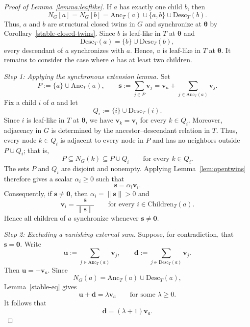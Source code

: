 \documentclass[10pt,a4paper]{amsart}
\begin{document}
\begin{proof}[Proof of Lemma~\ref{lemma:leaflike}]
If $a$ has exactly one child $b$, then
\[
    N_G[a]=N_G[b]
    =\mathrm{Anc}_T(a)\cup\{a,b\}\cup\mathrm{Desc}_T(b).
\]
Thus, $a$ and $b$ are structural closed twins in $G$ and
synchronize at $\boldsymbol{\theta}$ by
Corollary~\ref{stable-closed-twins}.
Since $b$ is leaf-like in $T$ at $\boldsymbol{\theta}$ and
\[
    \mathrm{Desc}_T(a)=\{b\}\cup\mathrm{Desc}_T(b),
\]
every descendant of $a$ synchronizes with $a$.
Hence, $a$ is leaf-like in $T$ at $\boldsymbol{\theta}$.
It remains to consider the case where $a$ has at least two
children.

\medskip
\noindent
\textit{Step 1: Applying the synchronous extension lemma.}
Set
\[
    P:=\{a\}\cup\mathrm{Anc}_T(a),
    \qquad
    \mathbf{s}:=\sum_{j\in P}\mathbf{v}_j
    =\mathbf{v}_a+\sum_{j\in\mathrm{Anc}_T(a)}\mathbf{v}_j.
\]
Fix a child $i$ of $a$ and let
\[
    Q_i:=\{i\}\cup\mathrm{Desc}_T(i).
\]
Since $i$ is leaf-like in $T$ at $\boldsymbol{\theta}$,
we have $\mathbf{v}_k=\mathbf{v}_i$ for every $k\in Q_i$.
Moreover, adjacency in $G$ is determined by the
ancestor--descendant relation in $T$.
Thus, every node $k\in Q_i$ is adjacent to every node in $P$
and has no neighbors outside $P\cup Q_i$; that is,
\[
    P\subseteq N_G(k)\subseteq P\cup Q_i
    \qquad \text{for every } k\in Q_i.
\]
The sets $P$ and $Q_i$ are disjoint and nonempty.
Applying Lemma~\ref{lem:opentwins} therefore gives a scalar
$\alpha_i\ge0$ such that
\[
    \mathbf{s}=\alpha_i\mathbf{v}_i.
\]
Consequently, if $\mathbf{s}\neq\boldsymbol{0}$, then
$\alpha_i=\|\mathbf{s}\|>0$ and
\[
    \mathbf{v}_i=\frac{\mathbf{s}}{\|\mathbf{s}\|}
    \qquad \text{for every } i\in\mathrm{Children}_T(a).
\]
Hence all children of $a$ synchronize whenever
$\mathbf{s}\neq\boldsymbol{0}$.

\medskip
\noindent
\textit{Step 2: Excluding a vanishing external sum.}
Suppose, for contradiction, that $\mathbf{s}=\boldsymbol{0}$.
Write
\[
    \mathbf{u}:=\sum_{j\in\mathrm{Anc}_T(a)}\mathbf{v}_j,
    \qquad
    \mathbf{d}:=\sum_{j\in\mathrm{Desc}_T(a)}\mathbf{v}_j.
\]
Then $\mathbf{u}=-\mathbf{v}_a$.
Since
\[
    N_G(a)=\mathrm{Anc}_T(a)\cup\mathrm{Desc}_T(a),
\]
Lemma~\ref{stable-eq} gives
\[
    \mathbf{u}+\mathbf{d}=\lambda\mathbf{v}_a
    \qquad \text{for some } \lambda\ge0.
\]
It follows that
\[
    \mathbf{d}=(\lambda+1)\mathbf{v}_a.
\]


\end{proof}
\end{document}
